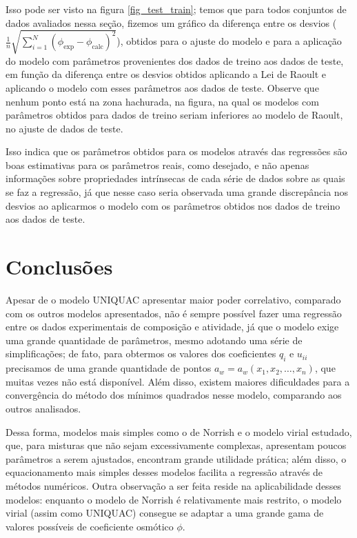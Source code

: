 \documentclass[
	12pt,				%
	openright,
	twoside,
	a4paper,			%
	brazil,			%
	french,				%
	spanish,			%
	english				%
	]{abntex2}
\begin{document}
Isso pode ser visto na figura \ref{fig_test_train}; temos que para todos conjuntos
de dados avaliados nessa seção, fizemos um gráfico da diferença entre os desvios
($\frac{1}{n}\sqrt{\sum_{i=1}^N\left(\phi_\text{exp}-\phi_\text{calc}\right)^2}$),
obtidos para o ajuste do modelo e para a aplicação do modelo com parâmetros
provenientes dos dados de treino aos dados de teste, em função da diferença entre
os desvios obtidos aplicando a Lei de Raoult e aplicando o modelo com esses
parâmetros aos dados de teste. Observe que nenhum ponto está na zona hachurada, na
figura, na qual os modelos com parâmetros obtidos para dados de treino seriam
inferiores ao modelo de Raoult, no ajuste de dados de teste.

Isso indica que os parâmetros obtidos para os modelos através das regressões são
boas estimativas para os parâmetros reais, como desejado, e não apenas informações
sobre propriedades intrínsecas de cada série de dados sobre as quais se faz a
regressão, já que nesse caso seria observada uma grande discrepância nos desvios
ao aplicarmos o modelo com os parâmetros obtidos nos dados de treino aos dados de
teste.


\part{Conclusões}

Apesar de o modelo UNIQUAC apresentar maior poder correlativo, comparado com os
outros modelos apresentados, não é sempre possível fazer uma regressão entre os
dados experimentais de composição e atividade, já que o modelo exige uma grande
quantidade de parâmetros, mesmo adotando uma série de simplificações; de fato,
para obtermos os valores dos coeficientes $q_i$ e $u_{ii}$ precisamos de uma grande
quantidade de pontos $a_w=a_w(x_1,x_2,\ldots,x_n)$, que muitas vezes não está
disponível. Além disso, existem maiores dificuldades para a convergência do método
dos mínimos quadrados nesse modelo, comparando aos outros analisados.

Dessa forma, modelos mais simples como o de Norrish e o modelo virial estudado, que,
para misturas que não sejam excessivamente complexas, apresentam poucos parâmetros
a serem ajustados, encontram grande utilidade prática; além disso, o equacionamento
mais simples desses modelos facilita a regressão através de métodos numéricos. Outra
observação a ser feita reside na aplicabilidade desses modelos: enquanto o modelo
de Norrish é relativamente mais restrito, o modelo virial (assim como UNIQUAC)
consegue se adaptar a uma grande gama de valores possíveis de coeficiente osmótico
$\phi$.
\end{document}
